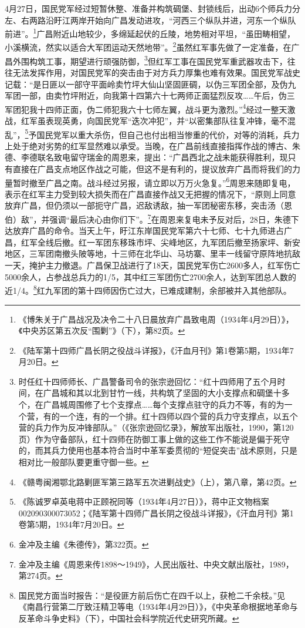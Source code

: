 4月27日，国民党军经过短暂休整、准备并构筑碉堡、封锁线后，出动6个师兵力分左、右两路沿盱江两岸开始向广昌发动进攻，“河西三个纵队并进，河东一个纵队前进”。\footnote{《博朱关于广昌战况及决令二十八日晨放弃广昌致电周（1934年4月29日）》，《中央苏区第五次反“围剿”》（下），第82页。}广昌附近山地较少，多绵延起伏的丘陵，地势相对平坦，“虽田畴相望，小溪横流，然实以适合大军团运动天然地带”。\footnote{《陆军第十四师广昌长阴之役战斗详报》，《汗血月刊》第1卷第5期，1934年7月20日。}虽然红军事先做了一定准备，在广昌外围构筑工事，期望进行顽强防御，\footnote{时任红十四师师长、广昌警备司令的张宗逊回忆：“红十四师用了五个月时间，在广昌城和其以北到甘竹一线，共构筑了坚固的大小支撑点和碉堡十多个，在广昌城周围修了七个支撑点……每个支撑点驻守的兵力不等，有的为一个营，有的一个连，有的一个排。红十四师以四个营的兵力守支撑点，以五个营的兵力作为反冲锋部队。”（《张宗逊回忆录》，解放军出版社，1990，第120页）作为守备部队，红十四师在防御工事上做的这些工作不能说是偏于死守的，而其兵力使用也基本符合当时中革军委贯彻的“短促突击”战术原则，只是相对比一般部队要更重守御一些。}但红军工事在国民党军重武器攻击下，往往无法发挥作用，对国民党军的突击由于对方兵力厚集也难有效果。国民党军战史记载：“是日匪以一部守平面岭卖竹坪大仙山坚固匪碉，以伪三军团全部，及伪九军团一部，由卖竹坪附近，向我第十四第六十七两师正面猛烈反攻……午后，伪三军团犯我十四师正面，伪二师犯我六十七师左翼，战斗更为激烈。”\footnote{《赣粤闽湘鄂北路剿匪军第三路军五次进剿战史》（上），第八章，第42页。}经过一整天激战，红军虽表现英勇，向国民党军“迭次冲犯”，并“以密集部队往复冲锋，毫不混乱”，\footnote{《陈诚罗卓英电蒋中正顾祝同等（1934年4月27日）》，蒋中正文物档案002090300073052；《陆军第十四师广昌长阴之役战斗详报》，《汗血月刊》第1卷第5期，1934年7月20日。}予国民党军以重大杀伤，但自己也付出相当惨重的代价，对等的消耗，兵力上处于绝对劣势的红军显然难以承受。当晚，在广昌前线直接指挥作战的博古、朱德、李德联名致电留守瑞金的周恩来，提出：“广昌西北之战未能获得胜利，现只有直接在广昌支点地区作战之可能，但这不是有利的，提议放弃广昌而将我们的力量暂时撤至广昌之南。战斗经过另报，请立即以万万火急复。”\footnote{金冲及主编《朱德传》，第322页。}周恩来随即复电，表示在红军主力受到较大损失而在广昌直接作战又无把握的情况下，“原则上同意放弃广昌，但仍须以一部扼守广昌，迟敌诱敌，抽一军团秘密东移，突击汤（恩伯）敌”，并强调“最后决心由你们下”。\footnote{金冲及主编《周恩来传1898～1949》，人民出版社、中央文献出版社，1989，第274页。}在周恩来复电未予反对后，28日，朱德下达放弃广昌的命令。当天上午，盱江东岸国民党军第六十七师、七十九师进占广昌，红军全线后撤。红一军团东移珠市坪、尖峰地区，九军团后撤至扬家坪、新安地区，三军团南撤头陂等地，十三师在北华山、马坊寨、里丰一线留守原阵地抗敌一天，掩护主力撤退。广昌保卫战进行了18天，国民党军伤亡2600多人，红军伤亡5000余人，占参战总兵力的1/5，其中红三军团伤亡2700余人，达到军团总人数的近1/4。\footnote{国民党方面当时报告：“是役匪方前后伤亡在四千以上，获枪二千余枝。”见《南昌行营第二厅致汪精卫等电（1934年4月29日）》，《中央革命根据地革命与反革命斗争史料》（下），中国社会科学院近代史研究所藏。}红九军团的第十四师因伤亡过大，已难成建制，余部被并入其他部队。


